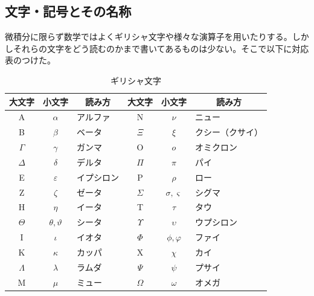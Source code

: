 \documentclass[a4j,dvipdfmx]{jsarticle}
\begin{document}
            \subsection{文字・記号とその名称}
                微積分に限らず数学ではよくギリシャ文字や様々な演算子を用いたりする。しかしそれらの文字をどう読むのかまで書いてあるものは少ない。そこで以下に対応表のつけた。
                \begin{table}[h]
                    \caption*{ギリシャ文字}
                    \centering
                    \begin{tabular}{|c|c|l||c|c|l|}\hline
                        大文字 & 小文字 & \multicolumn{1}{c||}{読み方} & 大文字 & 小文字 & \multicolumn{1}{c|}{読み方} \\\hline\hline
                        A & $\alpha$ & アルファ & N & $\nu$ & ニュー\\\hline
                        B & $\beta$ & ベータ & $\Xi$ & $\xi$ & クシー（クサイ）\\\hline
                        $\Gamma$ & $\gamma$ & ガンマ & O & $o$ & オミクロン \\\hline
                        $\Delta$ & $\delta$ & デルタ & $\Pi$ & $\pi$ & パイ\\\hline
                        E & $\varepsilon$ & イプシロン & P & $\rho$ & ロー \\\hline
                        Z & $\zeta$ & ゼータ & $\Sigma$ & $\sigma,\varsigma$ & シグマ\\\hline
                        H & $\eta$ & イータ & T & $\tau$ & タウ\\\hline
                        $\Theta$ & $\theta,\vartheta$ & シータ & $\Upsilon$ & $\upsilon$ & ウプシロン\\\hline
                        I & $\iota$ & イオタ & $\Phi$ & $\phi,\varphi$ & ファイ\\\hline
                        K & $\kappa$ & カッパ & X & $\chi$ & カイ\\\hline
                        $\Lambda$ & $\lambda$ & ラムダ & $\Psi$ & $\psi$ & プサイ\\\hline
                        M & $\mu$ & ミュー & $\Omega$ & $\omega$ & オメガ \\\hline
                    \end{tabular}
                    

\end{table}
\end{document}
